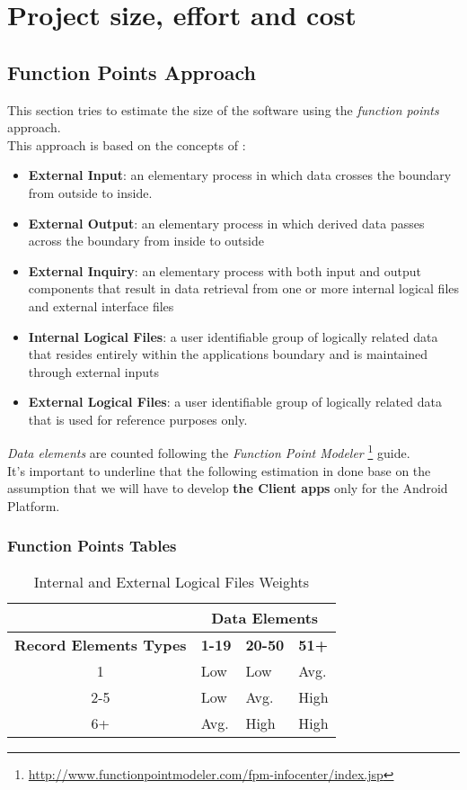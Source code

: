 \section{Project size, effort and cost}
\subsection{Function Points Approach} %
\label{sec:function_points_approach}
This section tries to estimate the size of the software using the \emph{function points} approach.\\
This approach is based on the concepts of :
\begin{itemize}
\item \textbf{External Input}: an elementary process in which data crosses the boundary from outside to inside.
\item \textbf{External Output}: an elementary process in which derived data passes across the boundary from inside to outside
\item \textbf{External Inquiry}: an elementary process with both input and output components that result in data retrieval from one or more internal logical files and external interface files
\item \textbf{Internal Logical Files}: a user identifiable group of logically related data that resides entirely within the applications boundary and is maintained through external inputs
\item \textbf{External Logical Files}: a user identifiable group of logically related data that is used for reference purposes only.
\end{itemize}
\emph{Data elements} are counted following the \emph{Function Point Modeler} \footnote{\url{http://www.functionpointmodeler.com/fpm-infocenter/index.jsp}} guide.\\
It's important to underline that the following estimation in done base on the assumption that we will have to develop \textbf{the Client apps} only for the Android Platform. 

\subsubsection{Function Points Tables} %
\label{sub:function_points_tables}

\begin{table}[!htbp]
\caption{Internal and External Logical Files Weights}
\begin{tabularx}{\textwidth}{|c|X|X|X|}
\hline
& \multicolumn{3}{|c|}{\textbf{Data Elements}}
\\ \hline
\textbf{\textbf{Record Elements Types}}      & \textbf{1-19} & \textbf{20-50}   & \textbf{51+}
\\ \hline
1 									   & Low           & Low              & Avg.
\\ \hline
2-5									   & Low           & Avg.             & High
\\ \hline
6+									   & Avg.          & High             & High
\\ \hline


\end{tabularx}
\end{table}


